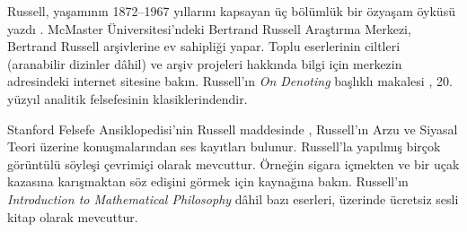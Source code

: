 \documentclass[../../../include/open-logic-section]{subfiles}
\begin{document}
\begin{reading}
Russell, yaşamının 1872--1967 yıllarını kapsayan üç bölümlük bir özyaşam
öyküsü yazdı \citep{Russell1967,Russell1968,Russell1969}. McMaster
Üniversitesi'ndeki Bertrand Russell Araştırma Merkezi, Bertrand Russell
arşivlerine ev sahipliği yapar. Toplu eserlerinin ciltleri (aranabilir
dizinler dâhil) ve arşiv projeleri hakkında bilgi için merkezin
\citet{Duncan2015} adresindeki internet sitesine bakın. Russell'ın
\emph{On Denoting} başlıklı makalesi \citep{Russell1905}, 20. yüzyıl analitik
felsefesinin klasiklerindendir.

Stanford Felsefe Ansiklopedisi'nin Russell maddesinde \citep{Irvine2015},
Russell'ın Arzu ve Siyasal Teori üzerine konuşmalarından ses kayıtları
bulunur. Russell'la yapılmış birçok görüntülü söyleşi çevrimiçi olarak
mevcuttur. Örneğin sigara içmekten ve bir uçak kazasına karışmaktan söz
edişini görmek için \citet{RussellND} kaynağına bakın. Russell'ın
\emph{Introduction to Mathematical Philosophy} dâhil bazı eserleri,
\citet{LibriVoxND} üzerinde ücretsiz sesli kitap olarak mevcuttur.
\end{reading}
\end{document}
